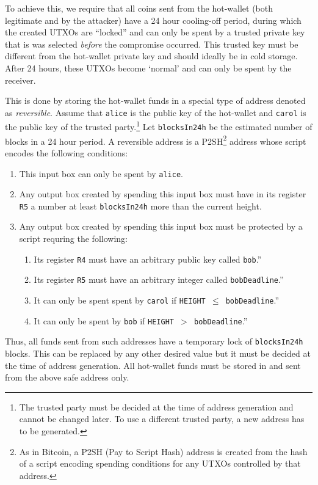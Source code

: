 \documentclass[11pt]{article}
\begin{document}
To achieve this, we require that all coins sent from the hot-wallet (both legitimate and by the attacker)
have a 24 hour cooling-off period, during which the created UTXOs are ``locked'' and can only be spent by a trusted private key that is was selected {\em before} the compromise occurred. This trusted key must be different from the hot-wallet private key and should ideally be in cold storage. 
After 24 hours, these UTXOs become `normal' and can only be spent by the receiver.

This is done by storing the hot-wallet funds in a special type of address denoted as {\em reversible}. Assume that \texttt{alice} is the public key of the hot-wallet and \texttt{carol} is the public key of the trusted party.\footnote{The trusted party must be decided at the time of address generation and cannot be changed later. To use a different trusted party, a new address has to be generated.} Let \texttt{blocksIn24h} be the estimated number of blocks in a 24 hour period. A reversible address is a P2SH\footnote{As in Bitcoin, a P2SH (Pay to Script Hash) address is created from the hash of a script encoding spending conditions for any UTXOs controlled by that address.} address whose script encodes the following conditions:   
\begin{enumerate}
	\item This input box can only be spent by \texttt{alice}.
	\item Any output box created by spending this input box must have in its register \texttt{R5} a number at least \texttt{blocksIn24h} more than the current height. 
	\item Any output box created by spending this input box must be protected by a script requring the following: 	
	\begin{enumerate}
		\item Its register \texttt{R4} must have an arbitrary public key called \texttt{bob}.'' 
		\item Its register \texttt{R5} must have an arbitrary integer called \texttt{bobDeadline}.'' 
		\item It can only be spent spent by \texttt{carol} if \texttt{HEIGHT $\leq$ bobDeadline}.''
		\item It can only be spent by \texttt{bob} if \texttt{HEIGHT $>$ bobDeadline}.''	
	\end{enumerate}  
\end{enumerate}

Thus, all funds sent from such addresses have a temporary lock of \texttt{blocksIn24h} blocks. This can be replaced by any other desired value but it must be decided at the time of address generation. All hot-wallet funds must be stored in and sent from the above safe address only. 
\end{document}
